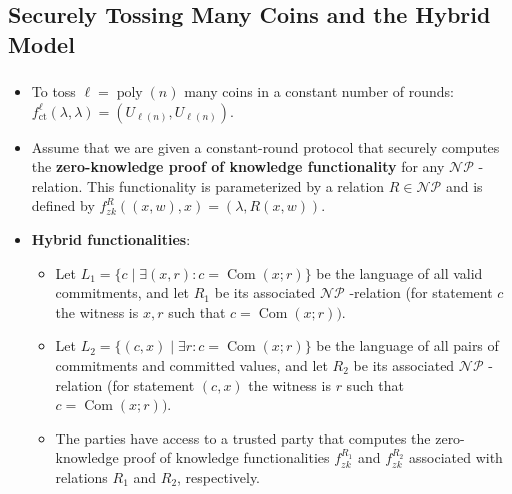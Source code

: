 \documentclass{beamer}
\begin{document}
    \subsection{Securely Tossing Many Coins and the Hybrid Model}
    \subsectionpage
    \begin{frame}
        \frametitle{}
    
        \begin{itemize}
            \item To toss $\ell=\operatorname{poly}(n)$ many coins in a constant number of rounds: $f_{\mathrm{ct}}^{\ell}(\lambda, \lambda)=\left(U_{\ell(n)}, U_{\ell(n)}\right) .$ 
            \item Assume that we are given a constant-round protocol that securely computes the \textbf{zero-knowledge proof of knowledge functionality} for any $\mathcal{N} \mathcal{P}$ -relation. This functionality is parameterized by a relation $R \in \mathcal{N} \mathcal{P}$ and is defined by $f_{z k}^{R}((x, w), x)=(\lambda, R(x, w)) .$ 
            \item \textbf{Hybrid functionalities}: 
            \begin{itemize}
                \item Let $L_{1}=\{c \mid \exists(x, r): c=\operatorname{Com}(x ; r)\}$ be the language of all valid commitments, and let $R_{1}$ be its associated $\mathcal{N} \mathcal{P}$ -relation (for statement $c$ the witness is $x, r$ such that $c=\operatorname{Com}(x ; r)) .$ 
                \item Let $L_{2}=\{(c, x) \mid \exists r: c=\operatorname{Com}(x ; r)\}$ be the language of all pairs of commitments and committed values, and let $R_{2}$ be its associated $\mathcal{N} \mathcal{P}$ -relation (for statement $(c, x)$ the witness is $r$ such that $c=\operatorname{Com}(x ; r))$. 
                \item The parties have access to a trusted party that computes the zero-knowledge proof of knowledge functionalities $f_{z k}^{R_{1}}$ and $f_{z k}^{R_{2}}$ associated with relations $R_{1}$ and $R_{2}$, respectively.
            \end{itemize}

        \end{itemize}
    
    \end{frame}
\end{document}
